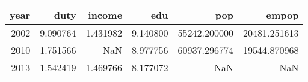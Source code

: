 \begin{tabular}{rrrrrr}
\toprule
 year &      duty &    income &       edu &           pop &         empop \\
\midrule
 2002 &  9.090764 &  1.431982 &  9.140800 &  55242.200000 &  20481.251613 \\
 2010 &  1.751566 &       NaN &  8.977756 &  60937.296774 &  19544.870968 \\
 2013 &  1.542419 &  1.469766 &  8.177072 &           NaN &           NaN \\
\bottomrule
\end{tabular}
